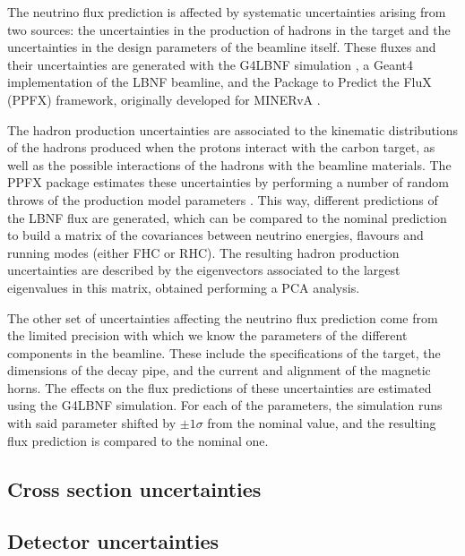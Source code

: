 The neutrino flux prediction is affected by systematic uncertainties arising from two sources: the uncertainties in the production of hadrons in the target and the uncertainties in the design parameters of the beamline itself. These fluxes and their uncertainties are generated with the G4LBNF simulation \cite{DUNE2020TDR2}, a Geant4 implementation of the LBNF beamline, and the Package to Predict the FluX (PPFX) framework, originally developed for MINERvA \cite{Golan2016}.

The hadron production uncertainties are associated to the kinematic distributions of the hadrons produced when the protons interact with the carbon target, as well as the possible interactions of the hadrons with the beamline materials. The PPFX package estimates these uncertainties by performing a number of random throws of the production model parameters \cite{Bashyal2017}. This way, different predictions of the LBNF flux are generated, which can be compared to the nominal prediction to build a matrix of the covariances between neutrino energies, flavours and running modes (either FHC or RHC). The resulting hadron production uncertainties are described by the eigenvectors associated to the largest eigenvalues in this matrix, obtained performing a PCA analysis.

The other set of uncertainties affecting the neutrino flux prediction come from the limited precision with which we know the parameters of the different components in the beamline. These include the specifications of the target, the dimensions of the decay pipe, and the current and alignment of the magnetic horns. The effects on the flux predictions of these uncertainties are estimated using the G4LBNF simulation. For each of the parameters, the simulation runs with said parameter shifted by $\pm 1\sigma$ from the nominal value, and the resulting flux prediction is compared to the nominal one.

\subsection{Cross section uncertainties}

\subsection{Detector uncertainties}